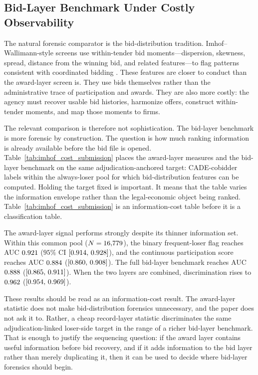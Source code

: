 \subsection{Bid-Layer Benchmark Under Costly Observability}
\label{sec:bid_layer_benchmark}

The natural forensic comparator is the bid-distribution
tradition. Imhof--Wallimann-style screens use within-tender bid
moments---dispersion, skewness, spread, distance from the winning
bid, and related features---to flag patterns consistent with
coordinated bidding
\citep{abrantesmetz2006a,imhof2018screening,imhof2019detecting,huber2019machine,wallimann2023machine}.
These features are closer to conduct than the award-layer screen
is. They use bids themselves rather than the administrative trace
of participation and awards. They are also more costly: the
agency must recover usable bid histories, harmonize offers,
construct within-tender moments, and map those moments to firms.

The relevant comparison is therefore not sophistication. The
bid-layer benchmark is more forensic by construction. The
question is how much ranking information is already available
before the bid file is opened. Table~\ref{tab:imhof_cost_submission}
places the award-layer measures and the bid-layer benchmark on
the same adjudication-anchored target: CADE-cobidder labels
within the always-loser pool for which bid-distribution features
can be computed. Holding the target fixed is important. It means
that the table varies the information envelope rather than the
legal-economic object being ranked.
Table~\ref{tab:imhof_cost_submission} is an information-cost
table before it is a classification table.

The award-layer signal performs strongly despite its thinner
information set. Within this common pool
($N=16{,}779$), the binary frequent-loser flag reaches AUC
$0.921$ ($95\%$ CI $[0.914,\,0.928]$), and the
continuous participation score reaches AUC $0.884$
($[0.860,\,0.908]$). The full bid-layer benchmark reaches AUC
$0.888$ ($[0.865,\,0.911]$). When the two layers are
combined, discrimination rises to $0.962$
($[0.954,\,0.969]$).

These results should be read as an information-cost result. The
award-layer statistic does not make bid-distribution forensics
unnecessary, and the paper does not ask it to. Rather, a cheap
record-layer statistic discriminates the same adjudication-linked
loser-side target in the range of a richer bid-layer benchmark.
That is enough to justify the sequencing question: if the award
layer contains useful information before bid recovery, and if it
adds information to the bid layer rather than merely duplicating
it, then it can be used to decide where bid-layer forensics
should begin.

